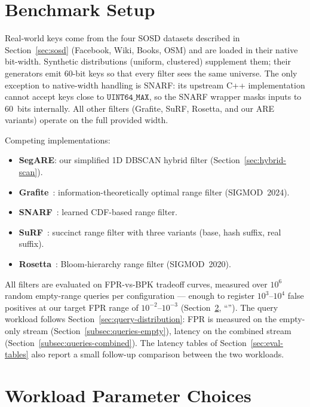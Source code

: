 \section{Benchmark Setup}
\label{sec:eval-setup}

Real-world keys come from the four SOSD datasets described in
Section~\ref{sec:sosd} (Facebook, Wiki, Books, OSM) and are
loaded in their native bit-width.
Synthetic distributions (uniform, clustered) supplement them; their
generators emit $60$-bit keys so that every filter sees the same
universe.
The only exception to native-width handling is SNARF: its upstream
C++ implementation cannot accept keys close to $\texttt{UINT64\_MAX}$,
so the SNARF wrapper masks inputs to $60$~bits internally. All other
filters (Grafite, SuRF, Rosetta, and our ARE variants) operate on the
full provided width.

Competing implementations:
\begin{itemize}
    \item \textbf{SegARE}: our simplified 1D DBSCAN hybrid filter (Section~\ref{sec:hybrid-scan}).
    \item \textbf{Grafite}~\citep{grafite2024}: information-theoretically optimal
    range filter (SIGMOD~2024).
    \item \textbf{SNARF}~\citep{vaidya2022snarf}: learned CDF-based range filter.
    \item \textbf{SuRF}~\citep{zhang2018surf}: succinct range filter with three variants
    (base, hash suffix, real suffix).
    \item \textbf{Rosetta}~\citep{luo2020rosetta}: Bloom-hierarchy range filter (SIGMOD~2020).
\end{itemize}

All filters are evaluated on FPR-vs-BPK tradeoff curves, measured over $10^6$
random empty-range queries per configuration --- enough to register
$10^3$--$10^4$ false positives at our target FPR range of $10^{-2}$--$10^{-3}$
(Section~\ref{sec:eval-workload-params}, ``'').
The query workload follows Section~\ref{sec:query-distribution}:
FPR is measured on the empty-only stream
(Section~\ref{subsec:queries-empty}), latency on the combined
stream (Section~\ref{subsec:queries-combined}). The latency tables
of Section~\ref{sec:eval-tables} also report a small follow-up
comparison between the two workloads.


\section{Workload Parameter Choices}
\label{sec:eval-workload-params}



